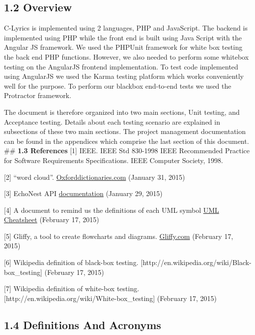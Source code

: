 \documentclass[]{article}
\begin{document}
\subsection{1.2 Overview}\label{overview}

C-Lyrics is implemented using 2 languages, PHP and JavaScript. The
backend is implemented using PHP while the front end is built using Java
Script with the Angular JS framework. We used the PHPUnit framework for
white box testing the back end PHP functions. However, we also needed to
perform some whitebox testing on the AngularJS frontend implementation.
To test code implemented using AngularJS we used the Karma testing
platform which works conveniently well for the purpose. To perform our
blackbox end-to-end tests we used the Protractor framework.

The document is therefore organized into two main sections, Unit
testing, and Acceptance testing. Details about each testing scenario are
explained in subsections of these two main sections. The project
management documentation can be found in the appendices which comprise
the last section of this document. \#\# \textbf{1.3 References} {[}1{]}
IEEE. IEEE Std 830-1998 IEEE Recommended Practice for Software
Requirements Specifications. IEEE Computer Society, 1998.

{[}2{]} ``word cloud''.
\href{http://www.oxforddictionaries.com/us/definition/american_english/word-cloud}{Oxforddictionaries.com}
(January 31, 2015)

{[}3{]} EchoNest API
\href{http://developer.echonest.com/docs/v4/index.html\#overview}{documentation}
(January 29, 2015)

{[}4{]} A document to remind us the definitions of each UML symbol
\href{http://loufranco.com/wp-content/uploads/2012/11/cheatsheet.pdf}{UML
Cheatsheet} (February 17, 2015)

{[}5{]} Gliffy, a tool to create flowcharts and diagrams.
\href{https://www.gliffy.com}{Gliffy.com} (February 17, 2015)

{[}6{]} Wikipedia definition of black-box testing.
{[}http://en.wikipedia.org/wiki/Black-box\_testing{]} (February 17,
2015)

{[}7{]} Wikipedia definition of white-box testing.
{[}http://en.wikipedia.org/wiki/White-box\_testing{]} (February 17,
2015)

\subsection{1.4 Definitions And
Acronyms}\label{definitions-and-acronyms}
\end{document}
